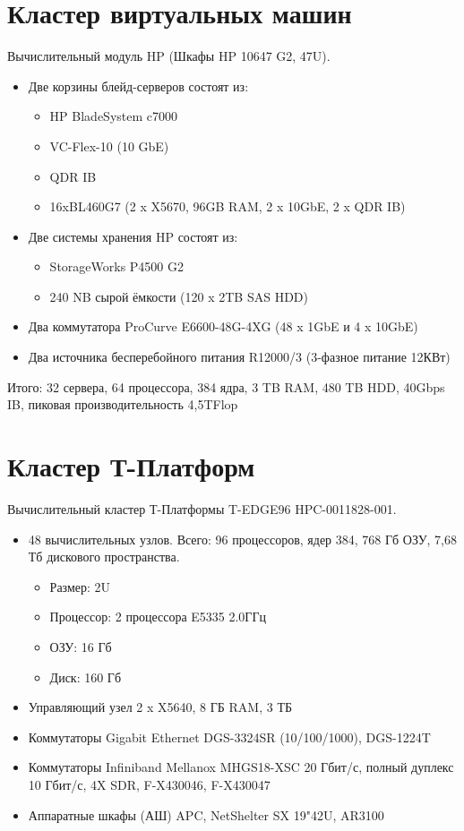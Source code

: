 \documentclass[a4paper,8pt]{extreport}
\newcounter{ex}
\begin{document}
\section{Кластер виртуальных машин}
Вычислительный модуль HP (Шкафы HP 10647 G2, 47U).
\begin{itemize}
 \item Две корзины блейд-серверов состоят из:
    \begin{itemize}
      \item HP BladeSystem c7000
      \item VC-Flex-10 (10 GbE)
      \item QDR IB
      \item 16xBL460G7 (2 x X5670, 96GB RAM, 2 x 10GbE, 2 x QDR IB)
    \end{itemize}
  \item Две системы хранения HP состоят из:
    \begin{itemize}
      \item StorageWorks P4500 G2
      \item 240 NB сырой ёмкости (120 x 2TB SAS HDD)
    \end{itemize}
  \item Два коммутатора ProCurve E6600-48G-4XG (48 x 1GbE и 4 x 10GbE)
  \item Два  источника бесперебойного питания R12000/3 (3-фазное питание 12КВт)
\end{itemize}

Итого: 32 сервера, 64 процессора, 384 ядра, 3 TB RAM, 480 TB HDD, 40Gbps IB, пиковая производительность 4,5TFlop

\section{Кластер Т-Платформ}
Вычислительный кластер Т-Платформы T-EDGE96 HPC-0011828-001.
\begin{itemize}
 \item  48 вычислительных узлов. Всего: 96 процессоров, ядер 384, 768 Гб ОЗУ, 7,68 Тб дискового пространства.
  \begin{itemize}
    \item Размер: 2U
    \item Процессор: 2 процессора E5335 2.0ГГц
    \item ОЗУ: 16 Гб
    \item Диск: 160 Гб
\end{itemize}
  \item Управляющий узел 2 x X5640, 8 ГБ RAM, 3 ТБ
  \item Коммутаторы Gigabit Ethernet DGS-3324SR (10/100/1000), DGS-1224T
  \item Коммутаторы Infiniband Mellanox MHGS18-XSC 20 Гбит/с, полный дуплекс 10 Гбит/с, 4X SDR, F-X430046, F-X430047
  \item Аппаратные шкафы (АШ) APC, NetShelter SX 19"42U, AR3100
\end{itemize}
\end{document}
